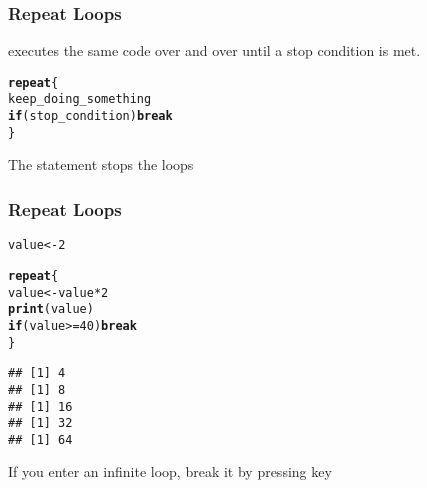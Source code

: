 \documentclass[12pt]{beamer}\usepackage[]{graphicx}\usepackage[]{color}
\makeatletter
\newcommand{\hlnum}[1]{\textcolor[rgb]{0.686,0.059,0.569}{#1}}%
\newcommand{\hlopt}[1]{\textcolor[rgb]{0,0,0}{#1}}%
\newcommand{\hlstd}[1]{\textcolor[rgb]{0.345,0.345,0.345}{#1}}%
\newcommand{\hlkwa}[1]{\textcolor[rgb]{0.161,0.373,0.58}{\textbf{#1}}}%
\newcommand{\hlkwb}[1]{\textcolor[rgb]{0.69,0.353,0.396}{#1}}%
\newcommand{\hlkwd}[1]{\textcolor[rgb]{0.737,0.353,0.396}{\textbf{#1}}}%
\newenvironment{kframe}{%
 \def\at@end@of@kframe{}%
 \ifinner\ifhmode%
  \def\at@end@of@kframe{\end{minipage}}%
  \begin{minipage}{\columnwidth}%
 \fi\fi%
 \def\FrameCommand##1{\hskip\@totalleftmargin \hskip-\fboxsep
 \colorbox{shadecolor}{##1}\hskip-\fboxsep
     \hskip-\linewidth \hskip-\@totalleftmargin \hskip\columnwidth}%
 \MakeFramed {\advance\hsize-\width
   \@totalleftmargin\z@ \linewidth\hsize
   \@setminipage}}%
 {\par\unskip\endMakeFramed%
 \at@end@of@kframe}
\newenvironment{knitrout}{}{} %
\makeatother
\begin{document}

\begin{frame}
\begin{center}
\Huge{}
\end{center}
\end{frame}


\begin{frame}[fragile]
\frametitle{Repeat Loops}

 executes the same code over and over until a stop condition is met.

\begin{knitrout}\footnotesize
{}\color{fgcolor}\begin{kframe}
\begin{alltt}
\hlkwa{repeat} \hlstd{\{}
  \hlstd{keep_doing_something}
  \hlkwa{if} \hlstd{(stop_condition)} \hlkwa{break}
\hlstd{\}}
\end{alltt}
\end{kframe}
\end{knitrout}

The  statement stops the loops

\end{frame}


\begin{frame}[fragile]
\frametitle{Repeat Loops}

\begin{knitrout}\footnotesize
{}\color{fgcolor}\begin{kframe}
\begin{alltt}
\hlstd{value} \hlkwb{<-} \hlnum{2}

\hlkwa{repeat} \hlstd{\{}
  \hlstd{value} \hlkwb{<-} \hlstd{value} \hlopt{*} \hlnum{2}
  \hlkwd{print}\hlstd{(value)}
  \hlkwa{if} \hlstd{(value} \hlopt{>=} \hlnum{40}\hlstd{)} \hlkwa{break}
\hlstd{\}}
\end{alltt}
\begin{verbatim}
## [1] 4
## [1] 8
## [1] 16
## [1] 32
## [1] 64
\end{verbatim}
\end{kframe}
\end{knitrout}

If you enter an infinite loop, break it by pressing  key

\end{frame}
\end{document}
